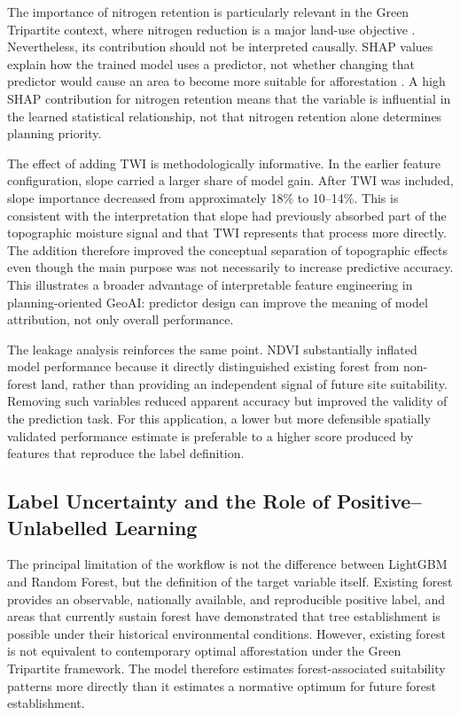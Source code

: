 \documentclass[land,article,submit,moreauthors]{Definitions/mdpi}
\begin{document}
The importance of nitrogen retention is particularly relevant in the Green Tripartite context, where nitrogen reduction is a major land-use objective \citep{regeringen2024a}. Nevertheless, its contribution should not be interpreted causally. SHAP values explain how the trained model uses a predictor, not whether changing that predictor would cause an area to become more suitable for afforestation \citep{lundberg2017shap}. A high SHAP contribution for nitrogen retention means that the variable is influential in the learned statistical relationship, not that nitrogen retention alone determines planning priority.

The effect of adding TWI is methodologically informative. In the earlier feature configuration, slope carried a larger share of model gain. After TWI was included, slope importance decreased from approximately 18\% to 10--14\%. This is consistent with the interpretation that slope had previously absorbed part of the topographic moisture signal and that TWI represents that process more directly. The addition therefore improved the conceptual separation of topographic effects even though the main purpose was not necessarily to increase predictive accuracy. This illustrates a broader advantage of interpretable feature engineering in planning-oriented GeoAI: predictor design can improve the meaning of model attribution, not only overall performance.

The leakage analysis reinforces the same point. NDVI substantially inflated model performance because it directly distinguished existing forest from non-forest land, rather than providing an independent signal of future site suitability. Removing such variables reduced apparent accuracy but improved the validity of the prediction task. For this application, a lower but more defensible spatially validated performance estimate is preferable to a higher score produced by features that reproduce the label definition.

\subsection{Label Uncertainty and the Role of Positive--Unlabelled Learning}
\label{sec:discussion-pu}

The principal limitation of the workflow is not the difference between LightGBM and Random Forest, but the definition of the target variable itself. Existing forest provides an observable, nationally available, and reproducible positive label, and areas that currently sustain forest have demonstrated that tree establishment is possible under their historical environmental conditions. However, existing forest is not equivalent to contemporary optimal afforestation under the Green Tripartite framework. The model therefore estimates forest-associated suitability patterns more directly than it estimates a normative optimum for future forest establishment.
\end{document}

